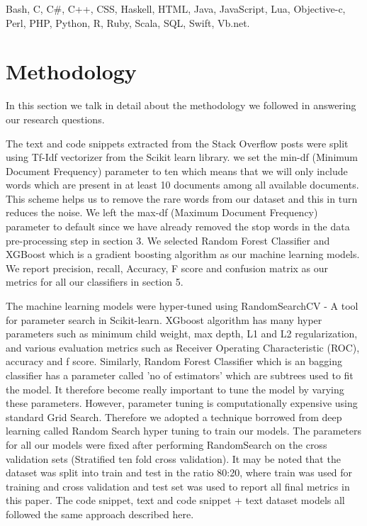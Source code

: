 \documentclass[letterpaper, 10 pt, conference]{ieeeconf}  %
\begin{document}
\begin{framed}
Bash, C, C\#, C++, CSS, Haskell, HTML, Java, JavaScript, Lua, Objective-c, Perl, PHP, Python, R, Ruby, Scala, SQL, Swift, Vb.net.
\end{framed}

 

\section{Methodology}
In this section we talk in detail about the methodology we followed in answering our research questions. 
  
The text and code snippets extracted from the Stack Overflow posts were split using Tf-Idf vectorizer from the Scikit learn library. we set the min-df (Minimum Document Frequency) parameter to ten which means that we will only include words which are present in at least 10 documents among all available documents. This scheme helps us to remove the rare words from our dataset and this in turn reduces the noise. We left the max-df (Maximum Document Frequency) parameter to default since we have already removed the stop words in the data pre-processing step in section 3. We selected Random Forest Classifier and XGBoost which is a gradient boosting algorithm as our machine learning models. We report precision, recall, Accuracy, F score and confusion matrix as our metrics for all our classifiers in section 5.
 

The machine learning models were hyper-tuned using RandomSearchCV - A tool for parameter search in Scikit-learn. XGboost algorithm has many hyper parameters such as minimum child weight, max depth, L1 and L2 regularization, and various evaluation metrics such as Receiver Operating Characteristic (ROC), accuracy and f score. Similarly, Random Forest Classifier which is an bagging classifier has a parameter called 'no of estimators' which are subtrees used to fit the model. It therefore become really important to tune the model by varying these parameters. However, parameter tuning is computationally expensive using standard Grid Search. Therefore we adopted a technique borrowed from deep learning called Random Search hyper tuning to train our models. The parameters for all our models were fixed after performing RandomSearch on the cross validation sets (Stratified ten fold cross validation). It may be noted that the dataset was split into train and test in the ratio 80:20, where train was used for training and cross validation and test set was used to report all final metrics in this paper. The code snippet, text and code snippet + text dataset models all followed the same approach described here.
 
\end{document}
